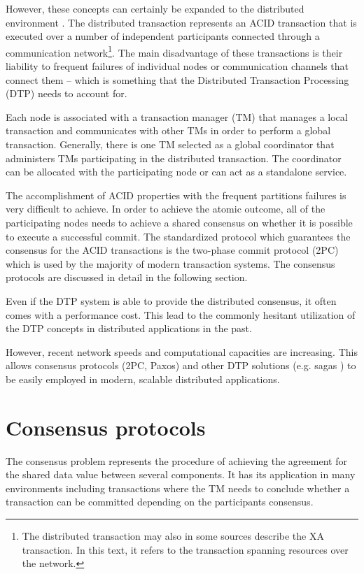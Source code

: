 \documentclass[oneside,
  digital, %
  table,   %
  lof,     %
  lot,     %
]{fithesis3}
\begin{document}
However, these concepts can certainly be expanded to the distributed environment \cite{java_tran_processing}. The distributed transaction represents an ACID transaction that is executed over a number of independent participants connected through a communication network\footnote{The distributed transaction may also in some sources describe the XA transaction. In this text, it refers to the transaction spanning resources over the network.}. The main disadvantage of these transactions is their liability to frequent failures of individual nodes or communication channels that connect them -- which is something that the Distributed Transaction Processing (DTP) needs to account for. 

Each node is associated with a transaction manager (TM) that manages a local transaction and communicates with other TMs in order to perform a global transaction. Generally, there is one TM selected as a global coordinator that administers TMs participating in the distributed transaction. The coordinator can be allocated with the participating node or can act as a standalone service.

The accomplishment of ACID properties with the frequent partitions failures is very difficult to achieve. In order to achieve the atomic outcome, all of the participating nodes needs to achieve a shared consensus on whether it is possible to execute a successful commit. The standardized protocol which guarantees the consensus for the ACID transactions is the two-phase commit protocol (2PC) which is used by the majority of modern transaction systems. The consensus protocols are discussed in detail in the following section.

Even if the DTP system is able to provide the distributed consensus, it often comes with a performance cost. This lead to the commonly hesitant utilization of the DTP concepts in distributed applications in the past. 

However, recent network speeds and computational capacities are increasing. This allows consensus protocols (2PC, Paxos) and other DTP solutions (e.g. sagas \cite{sagas_publ}) to be easily employed in modern, scalable distributed applications.



\section{Consensus protocols}
\label{sec:consensus-protocols}

The consensus problem represents the procedure of achieving the  agreement for the shared data value between several components. It has its application in many environments including transactions where the TM needs to conclude whether a transaction can be committed depending on the participants consensus.
\end{document}
